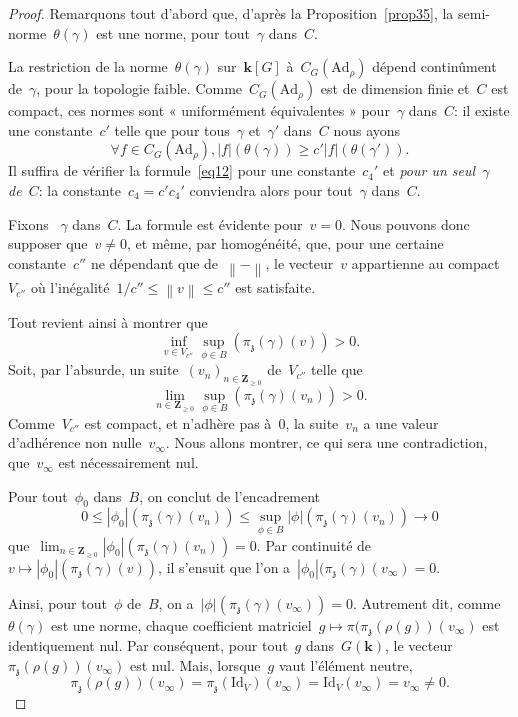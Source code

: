 \documentclass[french]{amsart}
\newcommand{\kk}{\mathbf{k}}
\newcommand{\abs}[1]{{\left|{#1}\right|}}
\newcommand{\Ad}{\mathrm{Ad}}
\newcommand{\lie}[1]{{\mathfrak{#1}}}
\newcommand{\Id}{\mathrm{Id}}
\newcommand{\Nm}[1]{{\left\|{#1}\right\|}}
\newcommand{\Z}{\mathbf{Z}}
\newcommand{\z}{\lie{z}}
\begin{document}
\begin{proof} Remarquons tout d'abord que, d'après la Proposition~\ref{prop35}, la semi-nor\-me~$\theta(\gamma)$ est une norme, pour tout~$\gamma$ dans~$C$.

La restriction de la norme~$\theta(\gamma)$ sur~$\kk[G]$ à~$C_G(\Ad_\rho)$ dépend continûment de~$\gamma$, pour la
topologie faible. Comme~$C_G(\Ad_\rho)$ est de dimension finie et~$C$ est compact, ces nor\-mes sont « uniformément équivalentes » pour~$\gamma$ dans~$C$:  il existe une constante~$c'$ telle que pour tous~$\gamma$ et~$\gamma'$ dans~$C$ nous ayons
\[\forall f\in C_G(\Ad_\rho),\abs{f}(\theta(\gamma))\geq c'\abs{f}(\theta(\gamma')).\] Il suffira de vérifier la formule~\eqref{eq12} pour une constante~$c_4'$ et \emph{pour un seul~$\gamma$ de~$C$}: la constante~$c_4=c'c_4'$ conviendra alors pour tout~$\gamma$ dans~$C$.

Fixons ~$\gamma$ dans~$C$. La formule est évidente pour~$v = 0$. Nous pouvons donc supposer que~$v \neq 0$, et même, par homogénéité, que, pour une certaine constante~$c''$ ne dépendant que de~$\Nm{-}$, le vecteur~$v$ appartienne au compact~$V_{c''}$ où l'inégalité~$1/c'' \leq \Nm{v} \leq c''$ est satisfaite.

Tout revient ainsi à montrer que
\[
\inf_{v\in V_{c''}}\sup_{\phi\in B}(\pi_\z(\gamma)(v))>0.
\]
Soit, par l'absurde, un suite~$(v_n)_{n\in \Z_{\geq0}}$ de~$V_{c''}$ telle que
\[
\lim_{n\in \Z_{\geq0}}\sup_{\phi\in B}(\pi_\z(\gamma)(v_n))>0.
\]
Comme~$V_{c''}$ est compact, et n'adhère pas à~$0$, la suite~$v_n$ a une valeur d'adhérence non nulle~$v_\infty$. Nous allons montrer, ce qui sera une contradiction, que~$v_\infty$ est nécessairement nul.

Pour tout~$\phi_0$ dans~$B$, on conclut de l'encadrement
\[
0\leq\abs{\phi_0}\left(\pi_\z(\gamma)(v_n)\right)\leq\sup_{\phi\in B}\abs{\phi}\left(\pi_\z(\gamma)(v_n)\right)\to 0
\]
que~$\lim_{n\in \Z_{\geq0}}\abs{\phi_0}\left(\pi_\z(\gamma)(v_n)\right)=0$. Par continuité de~$v\mapsto\abs{\phi_0}\left(\pi_\z(\gamma)(v)\right)$, il s'ensuit que l’on a~$\abs{\phi_0}(\pi_\z(\gamma)(v_\infty)=0$.

Ainsi, pour tout~$\phi$ de~$B$, on a~$\abs{\phi}(\pi_\z(\gamma)(v_\infty))=0$. Autrement dit, comme~$\theta(\gamma)$ est une
norme, chaque coefficient matriciel~$g\mapsto\pi(\pi_\z(\rho(g))(v_\infty)$ 
est identiquement nul. Par conséquent, pour tout~$g$ dans~$G(\kk)$, 
le vecteur~$\pi_\z (\rho(g))(v_\infty)$ est nul. Mais,
lorsque~$g$ vaut l'élément neutre,
\[
\pi_\z(\rho(g))(v_\infty)=\pi_\z(\Id_V)(v_\infty)=\Id_V(v_\infty)=v_\infty\neq0.
\]



\end{proof}
\end{document}
